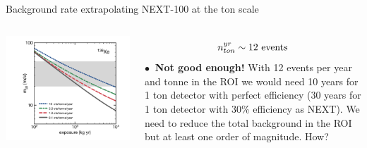 \documentclass [aspectratio=169]{beamer}
\begin{document}
\begin{frame}{Background rate extrapolating NEXT-100 at the ton scale}
\begin{columns}
\includegraphics[scale=0.28]{sensiXe.png}


\[
n_{ton}^{yr} \sim 12 {\rm ~events}
\]
$\bullet~$ {\bf Not good enough!} With 12 events per year and tonne in the ROI we would need 10 years for 1 ton detector with perfect efficiency (30 years for 1 ton detector with 30\% efficiency as NEXT). We need to reduce the total background in the ROI but at least one order of magnitude. How?

\end{columns}
\end{frame}
\end{document}
